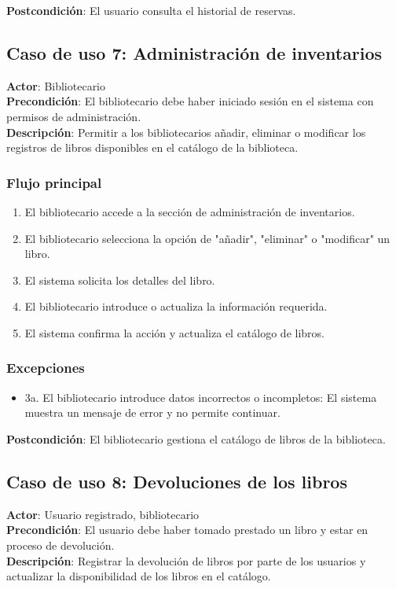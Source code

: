 \documentclass{scrreprt}
\begin{document}
\textbf{Postcondición}: El usuario consulta el historial de reservas.

\subsection{Caso de uso 7: Administración de inventarios}
\textbf{Actor}: Bibliotecario \\
\textbf{Precondición}: El bibliotecario debe haber iniciado sesión en el sistema con permisos de administración. \\
\textbf{Descripción}: Permitir a los bibliotecarios añadir, eliminar o modificar los registros de libros disponibles en el catálogo de la biblioteca.

\subsubsection{Flujo principal}
\begin{enumerate}
    \item El bibliotecario accede a la sección de administración de inventarios.
    \item El bibliotecario selecciona la opción de "añadir", "eliminar" o "modificar" un libro.
    \item El sistema solicita los detalles del libro.
    \item El bibliotecario introduce o actualiza la información requerida.
    \item El sistema confirma la acción y actualiza el catálogo de libros.
\end{enumerate}

\subsubsection{Excepciones}
\begin{itemize}
    \item 3a. El bibliotecario introduce datos incorrectos o incompletos: El sistema muestra un mensaje de error y no permite continuar.
\end{itemize}

\textbf{Postcondición}: El bibliotecario gestiona el catálogo de libros de la biblioteca.

\subsection{Caso de uso 8: Devoluciones de los libros}
\textbf{Actor}: Usuario registrado, bibliotecario \\
\textbf{Precondición}: El usuario debe haber tomado prestado un libro y estar en proceso de devolución. \\
\textbf{Descripción}: Registrar la devolución de libros por parte de los usuarios y actualizar la disponibilidad de los libros en el catálogo.
\end{document}
